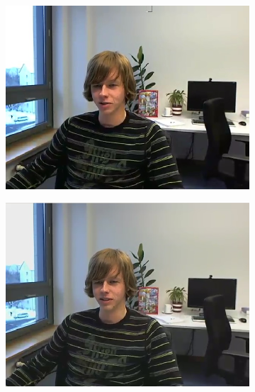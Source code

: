 \documentclass[11pt]{article} %
\begin{document}
%
\begin{figure}
	\centering
	\begin{subfigure}[t]{0.45\textwidth}
		\centering
		\includegraphics[width=\textwidth]{PaulDefault120_91250kbps}
		\caption{}
		\label{fig:QP Offset image comparison 1}
	\end{subfigure}
	\begin{subfigure}[t]{0.45\textwidth}
		\centering
		\includegraphics[width=\textwidth]{QPOffset/paul120_250kbps_QPoffset4}
		\caption{}
		\label{fig:QP Offset image comparison 2}
	\end{subfigure}
	\begin{subfigure}[t]{0.45\textwidth}
		\centering

\end{subfigure}
\end{figure}
\end{document}
